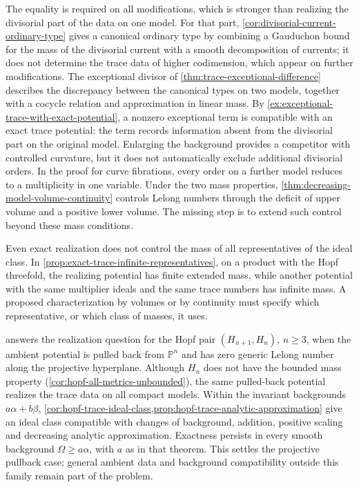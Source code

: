 The equality is required on all modifications, which is stronger than realizing the divisorial part of the data on one model. For that part, \cref{cor:divisorial-current-ordinary-type} gives a canonical ordinary type by combining a Gauduchon bound for the mass of the divisorial current with a smooth decomposition of currents; it does not determine the trace data of higher codimension, which appear on further modifications. The exceptional divisor of \cref{thm:trace-exceptional-difference} describes the discrepancy between the canonical types on two models, together with a cocycle relation and approximation in linear mass. By \cref{ex:exceptional-trace-with-exact-potential}, a nonzero exceptional term is compatible with an exact trace potential: the term records information absent from the divisorial part on the original model. Enlarging the background provides a competitor with controlled curvature, but it does not automatically exclude additional divisorial orders. In the proof for curve fibrations, every order on a further model reduces to a multiplicity in one variable. Under the two mass properties, \cref{thm:decreasing-model-volume-continuity} controls Lelong numbers through the deficit of upper volume and a positive lower volume. The missing step is to extend such control beyond these mass conditions.

Even exact realization does not control the mass of all representatives of the ideal class. In \cref{prop:exact-trace-infinite-representatives}, on a product with the Hopf threefold, the realizing potential has finite extended mass, while another potential with the same multiplier ideals and the same trace numbers has infinite mass. A proposed characterization by volumes or by continuity must specify which representative, or which class of masses, it uses.

 answers the realization question for the Hopf pair $(H_{n+1},H_n)$, $n\geq3$, when the ambient potential is pulled back from $\mathbb P^n$ and has zero generic Lelong number along the projective hyperplane. Although $H_n$ does not have the bounded mass property (\cref{cor:hopf-all-metrics-unbounded}), the same pulled-back potential realizes the trace data on all compact models. Within the invariant backgrounds $a\alpha+b\beta$, \cref{cor:hopf-trace-ideal-class,prop:hopf-trace-analytic-approximation} give an ideal class compatible with changes of background, addition, positive scaling and decreasing analytic approximation. Exactness persists in every smooth background $\Omega\geq a\alpha$, with $a$ as in that theorem. This settles the projective pullback case; general ambient data and background compatibility outside this family remain part of the problem.

